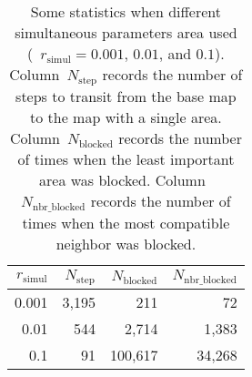\documentclass[twocolumn]{svjour3}          %
\begin{document}
\begin{table}[tb]
\centering
\caption{Some statistics when different simultaneous parameters area used 
    (\ie~$r_\mathrm{simul}=0.001$, $0.01$, and $0.1$).
    Column~$N_\mathrm{step}$ records the number of steps to transit 
    from the base map to the map with a single area.    
    Column~$N_\mathrm{blocked}$ records the number of times
    when the least important area was blocked.
    Column~$N_\mathrm{nbr\_blocked}$ records the number of times 
    when the most compatible neighbor was blocked.
}
\begin{tabular}{rrrr}
\toprule
$r_\mathrm{simul}$   & $N_\mathrm{step}$ & $N_\mathrm{blocked}$  & $N_\mathrm{nbr\_blocked}$ \\ \midrule
0.001                   &  3{,}195          &       211             &       72                  \\
0.01                    &  544              &   2{,}714             &  1{,}383                  \\
0.1                     &  91               & 100{,}617             & 34{,}268                  \\ 
\bottomrule 
\end{tabular}
\label{tbl:simultaneous_param_comparison}
\end{table}
\end{document}
